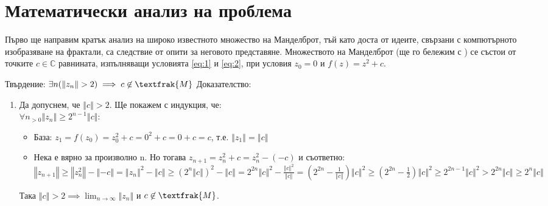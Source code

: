 \section{Математически анализ на проблема}
\begin{Large}

Първо ще направим кратък анализ на широко известното множество на Манделброт, тъй като доста от идеите, свързани с компютърното изобразяване на фрактали, са следствие от опити за неговото представяне. Множеството на Манделброт (ще го бележим с ) се състои от точките $c\in\mathbb{C}$ равнината, изпълняващи условията \ref{eq:1} и \ref{eq:2}, при условия $z_{0}=0$ и $f(z)=z^2+c$.
\newline
\vspace{0.1cm}
\par
\noindent
Твърдение: $\exists{n} (\left\Vert z_n \right\Vert > 2) \implies c\not\in \textfrak{M} $
\newline
Доказателство:

\begin{enumerate}

\item
Да допуснем, че $\left\Vert c \right\Vert > 2$. Ще покажем с индукция, че:\\
 $\forall{n_{>0}} \left\Vert z_n \right\Vert \geq 2^{n-1} \left\Vert c \right\Vert$:
\begin{itemize}

\item База: $z_1=f(z_0)=z_0^2+c=0^2+c=0+c=c$, т.е. $\left\Vert z_1 \right\Vert = \left\Vert c \right\Vert$


\item Нека е вярно за произволно n. Но тогава $z_{n+1}=z_n^2+c=z_n^2-(-c)$ и съответно:\\ $\left\Vert z_{n+1} \right\Vert \geq \left\Vert z_n^2 \right\Vert -  \left\Vert -c \right\Vert = {\left\Vert z_n \right\Vert}^2 -  \left\Vert c \right\Vert \geq (2^{n}\left\Vert c \right\Vert)^2 - \left\Vert c \right\Vert = 2^{2n} {\left\Vert c \right\Vert}^2 - \frac{{\left\Vert c \right\Vert}^2}{\left\Vert c \right\Vert} = (2^{2n}-\frac{1}{\left\Vert c \right\Vert}){\left\Vert c \right\Vert}^2 \geq (2^{2n}-\frac{1}{2}){\left\Vert c \right\Vert}^2 \geq 2^{2n-1}{\left\Vert c \right\Vert}^2 > 2^{2n} \left\Vert c \right\Vert \geq 2^n\left\Vert c \right\Vert $

\end{itemize}
Така $\left\Vert c \right\Vert > 2 \implies \lim_{n\to\infty}\left\Vert z_n \right\Vert$ и $c\not\in \textfrak{M}$. 



\end{enumerate}
\end{Large}

